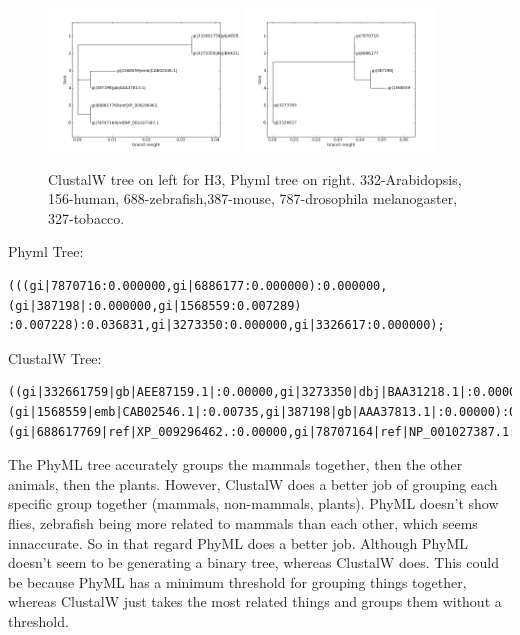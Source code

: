 \documentclass[10pt]{article} %
\begin{document}
\begin{figure}[h!]
  \centering
  \includegraphics[width=0.45\textwidth]{h3-clustalw.png}
  \includegraphics[width=0.45\textwidth]{h3-phyml.png}
  \caption{ClustalW tree on left for H3, Phyml tree on right. 332-Arabidopsis,
    156-human, 688-zebrafish,387-mouse, 787-drosophila melanogaster, 327-tobacco.}
\end{figure}

Phyml Tree:
\begin{verbatim}
(((gi|7870716:0.000000,gi|6886177:0.000000):0.000000,(gi|387198|:0.000000,gi|1568559:0.007289)
:0.007228):0.036831,gi|3273350:0.000000,gi|3326617:0.000000);
\end{verbatim}

ClustalW Tree:
\begin{verbatim}
((gi|332661759|gb|AEE87159.1|:0.00000,gi|3273350|dbj|BAA31218.1|:0.00000):0.03309,
(gi|1568559|emb|CAB02546.1|:0.00735,gi|387198|gb|AAA37813.1|:0.00000):0.00368,
(gi|688617769|ref|XP_009296462.:0.00000,gi|78707164|ref|NP_001027387.1:0.00000):0.00368);
\end{verbatim}

The PhyML tree accurately groups the mammals together, then the other animals, then the plants.
However, ClustalW does a better job of grouping each specific group together (mammals, non-mammals,
plants). PhyML doesn't show flies, zebrafish being more related to mammals than each other,
which seems innaccurate. So in that regard PhyML does a better job. Although PhyML doesn't seem
to be generating a binary tree, whereas ClustalW does. This could be because PhyML has a minimum
threshold for grouping things together, whereas ClustalW just takes the most related things and
groups them without a threshold.\\
\end{document}
